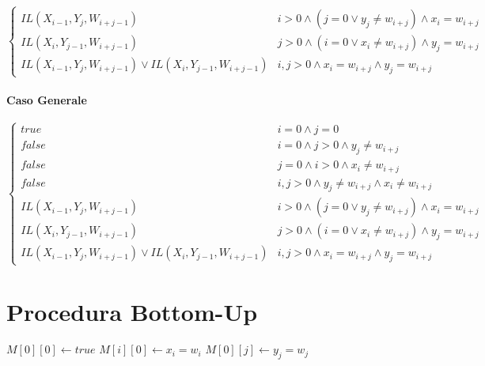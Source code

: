 \[
    \begin{cases}
        \text{$IL(X_{i-1}, Y_j, W_{i+j-1})$} & \text{$i > 0 \land (j = 0 \lor y_j \ne w_{i+j}) \land x_i = w_{i+j}$} \\
        \text{$IL(X_i, Y_{j-1}, W_{i+j-1})$} & \text{$j > 0 \land (i = 0 \lor x_i \ne w_{i+j}) \land y_j = w_{i+j}$} \\
        \text{$IL(X_{i-1}, Y_j, W_{i+j-1})\lor IL(X_i, Y_{j-1}, W_{i+j-1})$} & \text{$i,j > 0 \land x_i = w_{i+j} \land y_j = w_{i+j}$}
    \end{cases}
\]

\paragraph{Caso Generale}

\[
    \begin{cases}
        \text{$true$} & \text{$i = 0 \land j = 0$} \\
        \text{$false$} & \text{$i = 0 \land j > 0 \land y_j \ne w_{i+j}$} \\
        \text{$false$} & \text{$j = 0 \land i > 0 \land x_i \ne w_{i+j}$} \\
        \text{$false$} & \text{$i, j > 0 \land y_j \ne w_{i+j} \land x_i \ne w_{i+j}$} \\
        \text{$IL(X_{i-1}, Y_j, W_{i+j-1})$} & \text{$i > 0 \land (j = 0 \lor y_j \ne w_{i+j}) \land x_i = w_{i+j}$} \\
        \text{$IL(X_i, Y_{j-1}, W_{i+j-1})$} & \text{$j > 0 \land (i = 0 \lor x_i \ne w_{i+j}) \land y_j = w_{i+j}$} \\
        \text{$IL(X_{i-1}, Y_j, W_{i+j-1})\lor IL(X_i, Y_{j-1}, W_{i+j-1})$} & \text{$i,j > 0 \land x_i = w_{i+j} \land y_j = w_{i+j}$}
    \end{cases}
\]

\section{Procedura Bottom-Up}

\begin{algorithm}
    \begin{algorithmic}
            \State $M[0][0] \gets true$
                \State $M[i][0] \gets x_i = w_i$
            \EndFor
                \State $M[0][j] \gets y_j = w_j$
            \EndFor
        \EndProcedure
    \end{algorithmic}
\end{algorithm}

